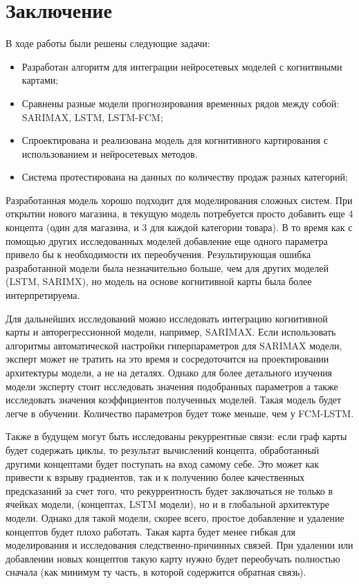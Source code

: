 \chapter*{Заключение}

В ходе работы были решены следующие задачи:

\begin{itemize}
	\item Разработан алгоритм для интеграции нейросетевых моделей с когнитвными картами;
	\item Сравнены разные модели прогнозирования временных рядов между собой: SARIMAX, LSTM, LSTM-FCM;
	\item Спроектирована и реализована модель для когнитивного картирования с использованием
	и нейросетевых методов.
	\item Система протестирована на данных по количеству продаж разных категорий;
\end{itemize}

Разработанная модель хорошо подходит для моделирования сложных систем.
При открытии нового магазина, в текущую модель потребуется просто добавить еще
4 концепта (один для магазина, и 3 для каждой категории товара). В то время
как с помощью других исследованных моделей добавление еще одного параметра
привело бы к необходимости их переобучения.
Результирующая ошибка разработанной модели была незначительно больше,
чем для других моделей (LSTM, SARIMX), но модель на основе когнитивной карты
была более интерпретируема.

Для дальнейших исследований можно исследовать интеграцию когнитивной карты
и авторегрессионной модели, например, SARIMAX. Если использовать алгоритмы
автоматической настройки гиперпараметров для SARIMAX модели, эксперт может не тратить
на это время и сосредоточится на проектировании архитектуры модели, а не на деталях.
Однако для более детального изучения модели эксперту стоит исследовать
значения подобранных параметров а также исследовать значения
коэффициентов полученных моделей. Такая модель будет легче в
обучении. Количество параметров будет тоже меньше, чем у FCM-LSTM.

Также в будущем могут быть исследованы рекуррентные связи:
если граф карты будет содержать циклы, то результат вычислений
концепта, обработанный другими концептами будет поступать на вход
самому себе. Это может как привести к взрыву градиентов, так и к
получению более качественных предсказаний за счет того, что рекуррентность
будет заключаться не только в ячейках модели, (концептах, LSTM модели), но и в
глобальной архитектуре модели. Однако для такой модели, скорее всего,
простое добавление и удаление концептов будет плохо работать. Такая карта будет
менее гибкая для моделирования и исследования следственно-причинных связей.
При удалении или добавлении новых концептов такую карту нужно будет переобучать полностью
сначала (как минимум ту часть, в которой содержится обратная связь).

